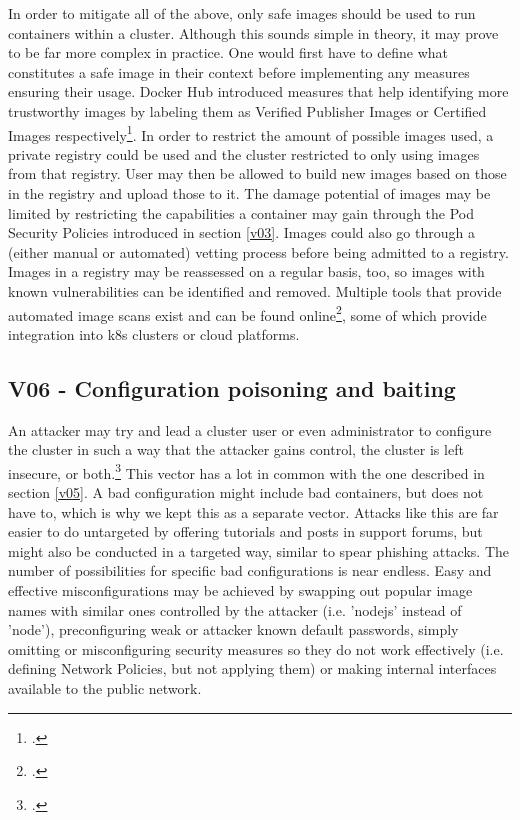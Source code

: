 In order to mitigate all of the above, only safe images should be used to run containers within a cluster. Although this sounds simple in theory, it may prove to be far more complex in practice. One would first have to define what constitutes a safe image in their context before implementing any measures ensuring their usage.
Docker Hub introduced measures that help identifying more trustworthy images by labeling them as Verified Publisher Images or Certified Images respectively\footcite[][, sections 'Verified Publisher Images and Plugins' and 'Certified Images and Plugins']{safeImagesDockerhub}.
In order to restrict the amount of possible images used, a private registry could be used and the cluster restricted to only using images from that registry. User may then be allowed to build new images based on those in the registry and upload those to it. 
The damage potential of images may be limited by restricting the capabilities a container may gain through the Pod Security Policies introduced in section \ref{v03}.
Images could also go through a (either manual or automated) vetting process before being admitted to a registry. Images in a registry may be reassessed on a regular basis, too, so images with known vulnerabilities can be identified and removed. Multiple tools that provide automated image scans exist and can be found online\footcite[][, section 'Securing your container images']{k8sBookWebsite}, some of which provide integration into \gls{k8s} clusters or cloud platforms.

\subsection{V06 - Configuration poisoning and baiting}
An attacker may try and lead a cluster user or even administrator to configure the cluster in such a way that the attacker gains control, the cluster is left insecure, or both.\footcite[][, p. 13 to 14]{nistK8s}
This vector has a lot in common with the one described in section \ref{v05}. A bad configuration might include bad containers, but does not have to, which is why we kept this as a separate vector. Attacks like this are far easier to do untargeted by offering tutorials and posts in support forums, but might also be conducted in a targeted way, similar to spear phishing attacks.
The number of possibilities for specific bad configurations is near endless. Easy and effective misconfigurations may be achieved by swapping out popular image names with similar ones controlled by the attacker (i.e. 'nodejs' instead of 'node'), preconfiguring weak or attacker known default passwords, simply omitting or misconfiguring security measures so they do not work effectively (i.e. defining Network Policies, but not applying them) or making internal interfaces available to the public network.


